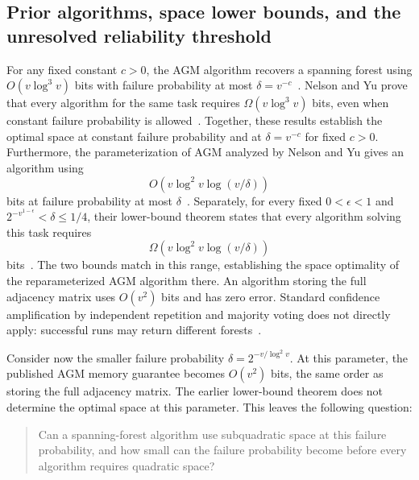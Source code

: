 \documentclass[11pt,letterpaper]{article}
\numberwithin{equation}{section}
\begin{document}
\subsection{Prior algorithms, space lower bounds, and the unresolved reliability threshold}

For any fixed constant $c>0$, the AGM algorithm recovers a spanning forest using $O(v\log^3v)$ bits with failure probability at most $\delta=v^{-c}$~\cite{AGM2012}.
Nelson and Yu prove that every algorithm for the same task requires $\Omega(v\log^3v)$ bits, even when constant failure probability is allowed~\cite{NelsonYu2019}.
Together, these results establish the optimal space at constant failure probability and at $\delta=v^{-c}$ for fixed $c>0$.
Furthermore, the parameterization of AGM analyzed by Nelson and Yu gives an algorithm using
\[
 O\!\left(v\log^2v\log(v/\delta)\right)
\]
bits at failure probability at most $\delta$~\cite[Appendix~A, Theorem~5]{NelsonYu2019}.
Separately, for every fixed $0<\epsilon<1$ and $2^{-v^{1-\epsilon}}<\delta\le1/4$, their lower-bound theorem states that every algorithm solving this task requires
\[
 \Omega\!\left(v\log^2v\log(v/\delta)\right)
\]
bits~\cite[Theorem~3]{NelsonYu2019}.
The two bounds match in this range, establishing the space optimality of the reparameterized AGM algorithm there.
An algorithm storing the full adjacency matrix uses $O(v^2)$ bits and has zero error.
Standard confidence amplification by independent repetition and majority voting does not directly apply: successful runs may return different forests~\cite[Appendix~A]{NelsonYu2019}.

Consider now the smaller failure probability $\delta=2^{-v/\log^2v}$.
At this parameter, the published AGM memory guarantee becomes $O(v^2)$ bits, the same order as storing the full adjacency matrix.
The earlier lower-bound theorem does not determine the optimal space at this parameter.
This leaves the following question:
\begin{quote}
Can a spanning-forest algorithm use subquadratic space at this failure probability, and how small can the failure probability become before every algorithm requires quadratic space?
\end{quote}
\end{document}
